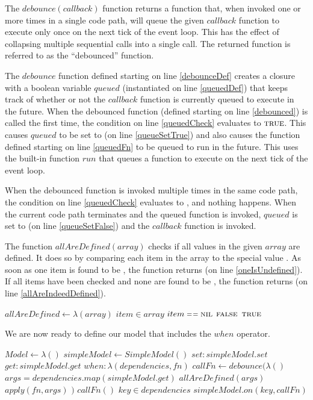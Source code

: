 The $debounce(callback)$ function returns a function that, when invoked one or more times in a single code path, will queue the given $callback$ function to execute only once on the next tick of the event loop. This has the effect of collapsing multiple sequential calls into a single call. The returned function is referred to as the ``debounced'' function.

The $debounce$ function defined starting on line \ref{debounceDef} creates a closure with a boolean variable $queued$ (instantiated on line \ref{queuedDef}) that keeps track of whether or not the $callback$ function is currently queued to execute in the future. When the debounced function (defined starting on line \ref{debounced}) is called the first time, the condition on line \ref{queuedCheck} evaluates to $\textnormal{\scshape true}$. This causes $queued$ to be set to  (on line \ref{queueSetTrue}) and also causes the function defined starting on line \ref{queuedFn} to be queued to run in the future. This uses the built-in function $run$ that queues a function to execute on the next tick of the event loop.

When the debounced function is invoked multiple times in the same code path, the condition on line \ref{queuedCheck} evaluates to , and nothing happens. When the current code path terminates and the queued function is invoked, $queued$ is set to  (on line \ref{queueSetFalse}) and the $callback$ function is invoked.

The function $allAreDefined(array)$ checks if all values in the given $array$ are defined. It does so by comparing each item in the array to the special value . As soon as one item is found to be , the function returns  (on line \ref{oneIsUndefined}). If all items have been checked and none are found to be , the function returns  (on line \ref{allAreIndeedDefined}).


\begin{codebox}
\li $allAreDefined \gets \lambda(array)$
\Do
  \li \For $item \in array$
  \Do
    \li \If $item \isequal \const{nil}$ 
    \Do
      \li \Return $\textnormal{\scshape false}$ \label{oneIsUndefined}
    \End
  \End
  \li \Return $\textnormal{\scshape true}$ \label{allAreIndeedDefined}
\End
\end{codebox}

We are now ready to define our model that includes the $when$ operator.

\begin{codebox}
\li $Model \gets \lambda()$
\Do
  \li $simpleModel \gets SimpleModel()$
  \li \Return
  \Do
    \li $set: simpleModel.set$
    \li $get: simpleModel.get$
    \li $when: \lambda(dependencies, fn)$
    \Do
      \li $callFn \gets debounce(\lambda()$
      \Do
        \li $args = dependencies.map(simpleModel.get)$
        \li \If $allAreDefined(args)$
        \Do
          \li $apply(fn, args)$
        \End
      \End
      \li $)$
      \li $callFn()$
      \li \For $key \in dependencies$
      \Do
        \li $simpleModel.on(key, callFn)$
      \End  
    \End
  \End
\End
\end{codebox}

